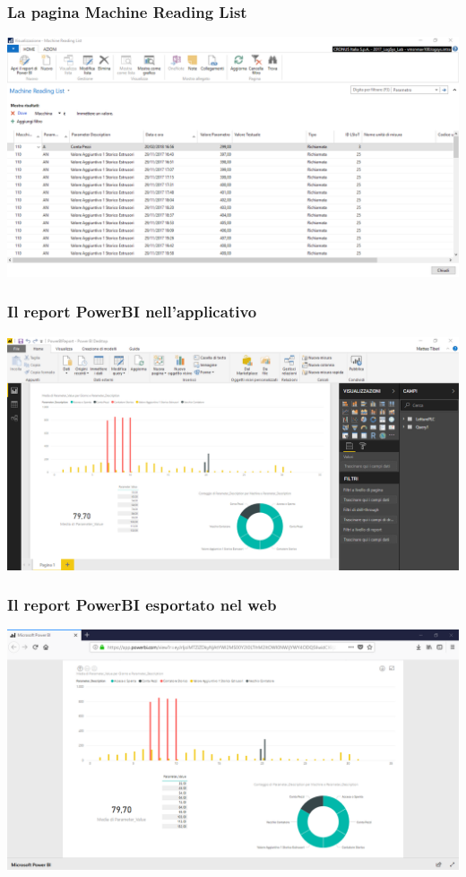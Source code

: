 \documentclass{beamer}
\begin{document}



\begin{frame}
\frametitle{La pagina Machine Reading List}
\includegraphics[width=1\textwidth]{images/MachineReadingList.png}
\end{frame}

\begin{frame}
\frametitle{Il report PowerBI nell'applicativo}
\includegraphics[width=1\textwidth]{images/PowerBI.png}
\end{frame}

\begin{frame}
\frametitle{Il report PowerBI esportato nel web}
\includegraphics[width=1\textwidth]{images/ReportWEB.png}
\end{frame}
\end{document}
